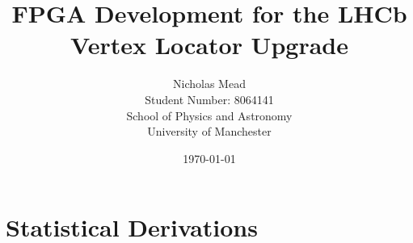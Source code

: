 \documentclass[a4paper,12pt,twoside]{article}
\title{FPGA Development for the LHCb Vertex Locator Upgrade}
\author
{
	Nicholas Mead\\
	Student Number: 8064141\\
	School of Physics and Astronomy\\
	University of Manchester
}
\date{\today}
\numberwithin{equation}{section}
\numberwithin{figure}{section}
\numberwithin{table}{section}
\let\Oldsection\section
\renewcommand{\section}{\FloatBarrier\Oldsection}
\begin{document}
	\begin{titlepage}
		\clearpage
		\maketitle \thispagestyle{empty}
		\vspace{1em}
		

		\newpage \thispagestyle{empty}
		\cleardoublepage  
		\footnotesize{\tableofcontents} 
		\thispagestyle{empty}	
	
	\end{titlepage}



	\setcounter{page}{1}

	

	

	

	


	

	\newpage 
	\printbibliography

	\newpage
	\appendix
	\section{Statistical Derivations}
	\label{stat_der}
	
\end{document}
